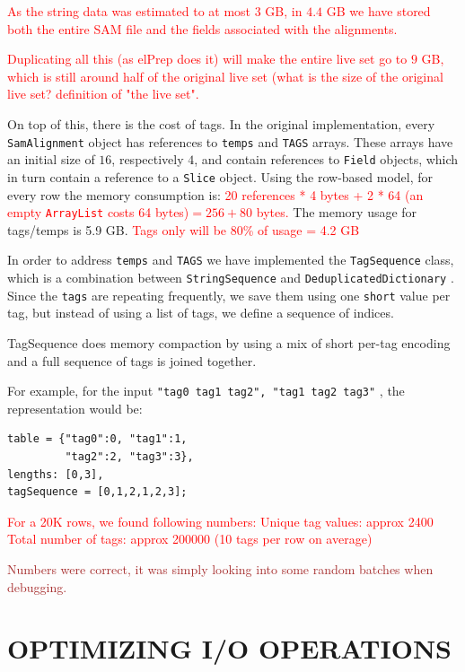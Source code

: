 \documentclass[a4paper,twoside]{article}
\begin{document}
\textcolor{red}{
As the string data was estimated to at most $3$ GB, in $4.4$ GB we have stored both the entire SAM file and the fields associated with the alignments.
}

\textcolor{red}{
Duplicating all this (as elPrep does it) will make the entire live set go to $9$ GB, which is still around half of the original live set (what is the size of the original live set?
definition of "the live set".
}

On top of this, there is the cost of tags.
In the original implementation, every {\texttt{SamAlignment} } object has references to {\texttt{temps} } and {\texttt{TAGS} } arrays.
These arrays have an initial size of $16$, respectively $4$, and contain references to {\texttt{Field} } objects, which in turn contain a reference to a {\texttt{Slice} } object.
Using the row-based model, for every row the memory consumption is:
\textcolor{red}{20 references * 4 bytes + 2 * 64 (an empty {\texttt{ArrayList} } costs 64 bytes)$= 256 + 80$ bytes.}
The memory usage for tags/temps is 5.9 GB\@.
\textcolor{red}{Tags only will be 80\% of usage = 4.2 GB}

In order to address {\texttt{temps} } and {\texttt{TAGS} } we have implemented the {\texttt{TagSequence} } class, which is a combination between {\texttt{StringSequence} } and {\texttt{DeduplicatedDictionary} }.
Since the {\texttt{tags} } are repeating frequently, we save them using one {\texttt{short} } value per tag, but instead of using a list of tags, we define a sequence of indices.

TagSequence does memory compaction by using a mix of short per-tag encoding and a full sequence of tags is joined together.

For example, for the input {\texttt{"tag0 tag1 tag2", "tag1 tag2 tag3"} }, the representation would be:
\begin{verbatim}
table = {"tag0":0, "tag1":1, 
         "tag2":2, "tag3":3},
lengths: [0,3], 
tagSequence = [0,1,2,1,2,3]; 
\end{verbatim}

\textcolor{red}{
For a 20K rows, we found following numbers:
Unique tag values: approx 2400
Total number of tags: approx 200000 (10 tags per row on average)
}

\textcolor{brown}{ Numbers were correct, it was simply looking into some random batches when debugging.
}


\section{\uppercase{Optimizing I/O Operations}}\label{sec:uppercase3}
\end{document}
